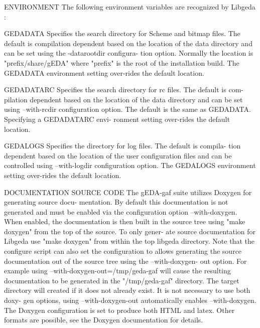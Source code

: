 ENVIRONMENT
       The following environment variables are recognized by Libgeda :

          GEDADATA
              Specifies the search directory for Scheme and bitmap files.  The
              default  is  compilation  dependent based on the location of the
              data directory and can be set using the -datarootdir  configura-
              tion  option. Normally the location is "prefix/share/gEDA" where
              "prefix" is the root of the installation  build.   The  GEDADATA
              environment setting over-rides the default location.

          GEDADATARC
              Specifies the search directory for rc files. The default is com-
              pilation dependent based on the location of the  data  directory
              and  can  be  set  using  --with-rcdir configuration option. The
              default is the same as GEDADATA.  Specifying a GEDADATARC  envi-
              ronment setting over-rides the default location.

          GEDALOGS
              Specifies  the  directory for log files. The default is compila-
              tion dependent based on the location of the  user  configuration
              files  and  can  be controlled using --with-logdir configuration
              option. The GEDALOGS environment setting over-rides the  default
              location.

DOCUMENTATION
          SOURCE CODE
              The  gEDA-gaf suite utilizes Doxygen for generating source docu-
              mentation. By default this documentation is  not  generated  and
              must  be  enabled  via  the configuration option --with-doxygen.
              When enabled, the documentation is then built in the source tree
              using  "make doxygen" from the top of the source. To only gener-
              ate source documentation for Libgeda  use  "make  doxygen"  from
              within the top libgeda directory. Note that the configure script
              can also set the configuration to allows generating  the  source
              documentation  out  of the source tree using the --with-doxygen-
              out option. For example  using  --with-doxygen-out=/tmp/geda-gaf
              will  cause  the  resulting documentation to be generated in the
              "/tmp/geda-gaf" directory. The target directory will created  if
              it does not already exist. It is not necessary to use both doxy-
              gen  options,  using  --with-doxygen-out  automatically  enables
              --with-doxygen.   The  Doxygen  configuration  is set to produce
              both HTML and latex. Other formats are possible, see the Doxygen
              documentation for details.

